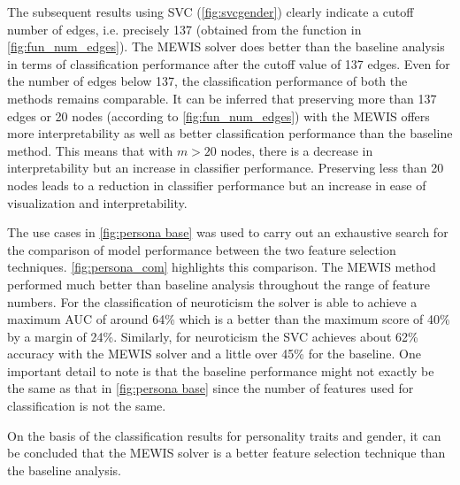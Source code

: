 \documentclass[msthesis.tex]{subfiles}
\begin{document}
The subsequent results using \gls{SVC} (\cref{fig:svcgender}) clearly indicate a cutoff number of edges, i.e. precisely 137 (obtained from the function in \cref{fig:fun_num_edges}). The \gls{MEWIS} solver does better than the baseline analysis in terms of classification performance after the cutoff value of 137 edges. Even for the number of edges below 137, the classification performance of both the methods remains comparable.  It can be inferred that preserving more than 137 edges or 20 nodes (according to \cref{fig:fun_num_edges}) with the \gls{MEWIS} offers more interpretability as well as better classification performance than the baseline method. This means that with $m> 20$ nodes, there is a decrease in interpretability but an increase in classifier performance. Preserving less than 20 nodes leads to a reduction in classifier performance but an increase in ease of visualization and interpretability.

The use cases in \cref{fig:persona base} was used to carry out an exhaustive search for the comparison of model performance between the two feature selection techniques. \cref{fig:persona_com} highlights this comparison. The \gls{MEWIS} method performed much better than baseline analysis throughout the range of feature numbers. For the classification of neuroticism the solver is able to achieve a maximum \gls{AUC} of around 64\% which is a better than the maximum score of 40\% by a margin of 24\%. Similarly, for neuroticism the \gls{SVC} achieves about 62\% accuracy with the \gls{MEWIS} solver and a little over 45\% for the baseline. One important detail to note is that the baseline performance might not exactly be the same as that in \cref{fig:persona base} since the number of features used for classification is not the same.

On the basis of the classification results for personality traits and gender, it can be concluded that the \gls{MEWIS} solver is a better feature selection technique than the baseline analysis.

\end{document}
